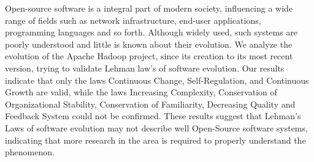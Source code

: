 Open-source software is a integral part of modern society, influencing a wide range of fields such as network infrastructure, end-user applications, programming languages and so forth. Although widely used, such systems are poorly understood and little is known about their evolution. We analyze the evolution of the Apache Hadoop project, since its creation to its most recent version, trying to validate Lehman law's of software evolution. Our results indicate that only the laws Continuous Change, Self-Regulation, and Continuous Growth are valid, while the laws Increasing Complexity, Conservation of Organizational Stability, Conservation of Familiarity, Decreasing Quality and Feedback System could not be confirmed. These results suggest that Lehman's Laws of software evolution may not describe well Open-Source software systems, indicating that more research in the area is required to properly understand the phenomenon.